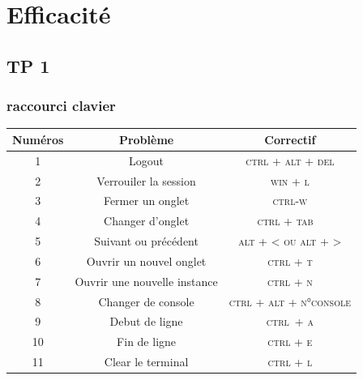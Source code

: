 \documentclass{report}
\begin{document}
\chapter{Efficacité}
\section{TP 1}
 
\subsection{raccourci clavier}
\begin{tabular}{|c|c|c|}
	\hline
	\textbf{Numéros} &  \textbf{Problème} & \textbf{Correctif} \\ 
	\hline
	1 & Logout & \textsc{ctrl + alt + del} \\
	\hline
	2 & Verrouiler la session & \textsc{win + l} \\
	\hline  
	3 & Fermer un onglet & \textsc{ctrl-w} \\
	\hline
	4 & Changer d'onglet & \textsc{ctrl + tab}  \\
	\hline
	5 & Suivant ou précédent & \textsc{alt + < ou alt + >} \\
	\hline 
	6 & Ouvrir un nouvel onglet & \textsc{ctrl + t} \\
	\hline
	7 & Ouvrir une nouvelle instance & \textsc{ctrl + n} \\
	\hline 
	8 & Changer de console & \textsc{ctrl + alt + n°console} \\
	\hline 
	9 & Debut de ligne & \textsc{ctrl + a} \\
	\hline 
	10 & Fin de ligne & \textsc{ctrl + e} \\
	\hline 
	11 & Clear le terminal & \textsc{ctrl + l} \\
	\hline 
\end{tabular}
\end{document}

